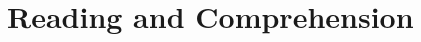 \documentclass[
    12pt,
    a4paper,
    oneside,
    openany
]{book}
\begin{document}
\part{Reading and Comprehension}



\end{document}
